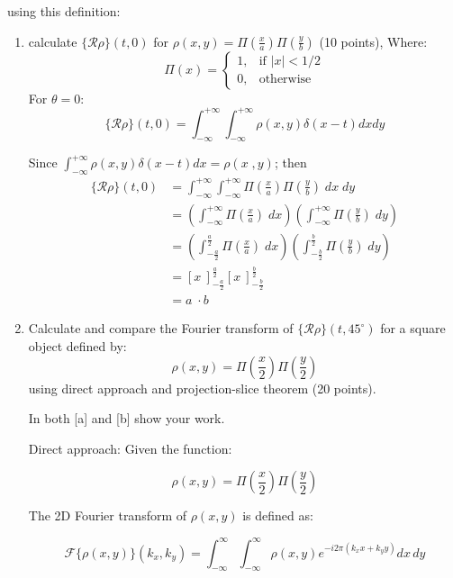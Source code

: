 \documentclass[12pt,twoside]{article}
\begin{document}
  using this definition:
    \begin{enumerate}
        \item calculate $\{ \mathcal{R} \rho \}(t, 0)$ for $\rho(x, y) = \Pi\left(\frac{x}{a}\right)\Pi\left(\frac{y}{b}\right)$ (10 points), Where:
        \[
        \Pi(x) = 
        \begin{cases} 
        1, & \text{if } |x| < 1/2 \\ 
        0, & \text{otherwise}
        \end{cases}
        \]
        For $\theta=0$:
	\begin{equation}
            \{ \mathcal{R} \rho \}(t, 0) = \int_{-\infty}^{+\infty} \int_{-\infty}^{+\infty} \rho(x, y) \delta(x  - t) dx dy
	\end{equation}

	Since $ \int_{-\infty}^{+\infty}  \rho (x ,y) \delta(x  - t) dx =  \rho (x \; , y)$; then 
	 \begin{align*}
	 	 	\{ \mathcal{R} \rho \}(t, 0) &= \int_{-\infty}^{+\infty}  \int_{-\infty}^{+\infty} \Pi(\frac{x}{a}) \Pi(\frac{y}{b}) \; dx \; dy \\
			&=  \left( \int_{-\infty}^{+\infty}   \Pi(\frac{x}{a}) \; dx \right) \left( \int_{-\infty}^{+\infty}  \Pi(\frac{y}{b}) \; dy  \right)\\
			&=  \left( \int_{-\frac{a}{2}}^{\frac{a}{2}}   \Pi(\frac{x}{a}) \; dx \right) \left(\int_{-\frac{b}{2}}^{\frac{b}{2}}  \Pi(\frac{y}{b}) \; dy  \right)\\
			&= \left[ x\ \right]_{-\frac{a}{2}}^{\frac{a}{2}} \left[ x\ \right]_{-\frac{b}{2}}^{\frac{b}{2}} \\
			&= a \; \cdot  b
	\end{align*}

        \item Calculate and compare the Fourier transform of $\{ \mathcal{R} \rho \}(t, 45^{\circ})$ for a square object defined by:
        \[
        \rho(x, y) = \Pi\left(\frac{x}{2}\right)\Pi\left(\frac{y}{2}\right)
        \]
        using direct approach and projection-slice theorem (20 points).
        
        In both [a] and [b] show your work.
        
        Direct approach:  
     Given the function:

\[
\rho(x,y) = \Pi\left(\frac{x}{2}\right)\Pi\left(\frac{y}{2}\right)
\]

The 2D Fourier transform of $\rho(x,y)$ is defined as:

\[
\mathcal{F}\{\rho(x,y)\}(k_x, k_y) = \int_{-\infty}^{\infty}\int_{-\infty}^{\infty} \rho(x,y) e^{-i 2\pi(k_x x + k_y y)} dx\, dy
\]


\end{enumerate}
\end{document}
